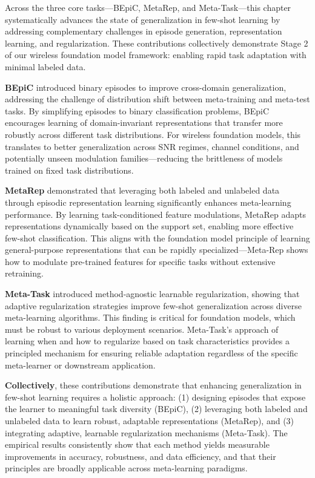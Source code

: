 Across the three core tasks—BEpiC, MetaRep, and Meta-Task—this chapter systematically advances the state of generalization in few-shot learning by addressing complementary challenges in episode generation, representation learning, and regularization. These contributions collectively demonstrate Stage 2 of our wireless foundation model framework: enabling rapid task adaptation with minimal labeled data.

\textbf{BEpiC} introduced binary episodes to improve cross-domain generalization, addressing the challenge of distribution shift between meta-training and meta-test tasks. By simplifying episodes to binary classification problems, BEpiC encourages learning of domain-invariant representations that transfer more robustly across different task distributions. For wireless foundation models, this translates to better generalization across SNR regimes, channel conditions, and potentially unseen modulation families—reducing the brittleness of models trained on fixed task distributions.

\textbf{MetaRep} demonstrated that leveraging both labeled and unlabeled data through episodic representation learning significantly enhances meta-learning performance. By learning task-conditioned feature modulations, MetaRep adapts representations dynamically based on the support set, enabling more effective few-shot classification. This aligns with the foundation model principle of learning general-purpose representations that can be rapidly specialized—Meta-Rep shows how to modulate pre-trained features for specific tasks without extensive retraining.

\textbf{Meta-Task} introduced method-agnostic learnable regularization, showing that adaptive regularization strategies improve few-shot generalization across diverse meta-learning algorithms. This finding is critical for foundation models, which must be robust to various deployment scenarios. Meta-Task's approach of learning when and how to regularize based on task characteristics provides a principled mechanism for ensuring reliable adaptation regardless of the specific meta-learner or downstream application.

\textbf{Collectively}, these contributions demonstrate that enhancing generalization in few-shot learning requires a holistic approach: (1) designing episodes that expose the learner to meaningful task diversity (BEpiC), (2) leveraging both labeled and unlabeled data to learn robust, adaptable representations (MetaRep), and (3) integrating adaptive, learnable regularization mechanisms (Meta-Task). The empirical results consistently show that each method yields measurable improvements in accuracy, robustness, and data efficiency, and that their principles are broadly applicable across meta-learning paradigms.

